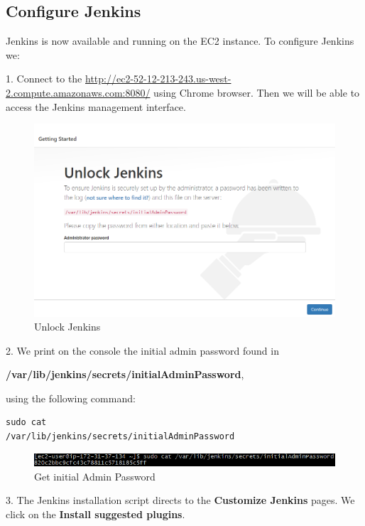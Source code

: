 \documentclass[12pt,a4paper,twoside]{article}
\begin{document}
\subsection{Configure Jenkins}


Jenkins is now available and running on the EC2 instance. To configure Jenkins we:


1. Connect to the \url{http://ec2-52-12-213-243.us-west-2.compute.amazonaws.com:8080/} using Chrome browser.
Then we will be able to access the Jenkins management interface.


\begin{figure}[H]
    \centering
        \includegraphics[width=15cm]{images-aws/20-unlock-jenkins.png}
        \caption{Unlock Jenkins}
\end{figure}


2. We print on the console the initial admin password found in

 \textbf{/var/lib/jenkins/secrets/initialAdminPassword}, 

using the following command:


\begin{verbatim}
sudo cat
/var/lib/jenkins/secrets/initialAdminPassword
\end{verbatim}


\begin{figure}[H]
    \centering
        \includegraphics[width=13cm]{images-aws/21-get-jenkins-admin-pass.png}
        \caption{Get initial Admin Password}
\end{figure}


3. The Jenkins installation script directs to the \textbf{Customize Jenkins} pages. We click on the  \textbf{Install suggested plugins}.
\end{document}
